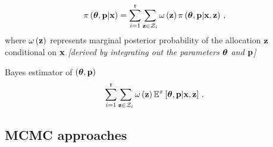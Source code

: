 \begin{slide}
$$
\pi\left(\mbox{\boldmath{$\theta$}},\mathbf{p}|\mathbf{x}\right)=\sum_{i=1}^\mathfrak{r}\sum_{{\bf z} \in\mathcal{Z}_i}
\omega\left({\bf z}\right) \pi\left(\mbox{\boldmath{$\theta$}},\mathbf{p}|\mathbf{x},{\bf z}\right)\,,
$$
where $\omega\left({\bf z}\right)$ represents marginal posterior probability
of the allocation ${\bf z}$ conditional on $\mathbf{x}$
{\em [derived by integrating out the parameters $\mbox{\boldmath{$\theta$}}$ and $\mathbf{p}$]}

\vs\pause
Bayes estimator of $\left(\mbox{\boldmath{$\theta$}}, \mathbf{p}\right)$ 
$$
\sum_{i=1}^\mathfrak{r}\sum_{{\bf z}\in\mathcal{Z}_i}\omega\left({\bf z}\right) 
\mathbb{E}^\pi\left[\mbox{\boldmath{$\theta$}},\mathbf{p}|\mathbf{x},{\bf z}\right]\,.
$$

\vs\pause
\centerline{}

\end{slide}\subsection{MCMC approaches}
